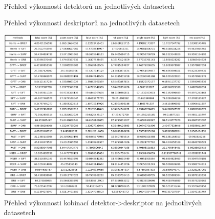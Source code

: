 \begin{figure}[htp] 
	\caption{Přehled výkonnosti detektorů na jednotlivých datasetech} \label{det_perf}
\end{figure}

\begin{figure}[htp] 
	\caption{Přehled výkonnosti deskriptorů na jednotlivých datasetech}	\label{desc_perf}
\end{figure}

\begin{figure}[htp] 
	\centering{}
		\includegraphics[scale=1]{text_img/Det_desc_perf.pdf}
	\caption{Přehled výkonnosti kobinací detektor->deskriptor na jednotlivých datasetech} \label{det_desc_perf}
\end{figure}

